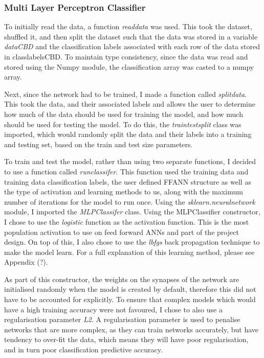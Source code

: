 \documentclass[11pt]{article}
\begin{document}
\subsubsection{Multi Layer Perceptron Classifier}
To initially read the data, a function \textit{read\textunderscore data} was used. This took the dataset, shuffled it, and then split the dataset such that the data was stored in a variable \textit{data\textunderscore CBD} and the classification labels associated with each row of the data stored in {class\textunderscore labels\textunderscore CBD}. To maintain type consistency, since the data was read and stored using the Numpy module, the classification array was casted to a numpy array. 

Next, since the network had to be trained, I made a function called \textit{split\textunderscore data}. This took the data, and their associated labels and allows the user to determine how much of the data should be used for training the model, and how much should be used for testing the model. To do this, the \textit{train\textunderscore test\textunderscore split} class was imported, which would randomly split the data and their labels into a training and testing set, based on the train and test size parameters. 

To train and test the model, rather than using two separate functions, I decided to use a function called \textit{run\textunderscore classifer}. This function used the training data and training data classification labels, the user defined FFANN structure as well as the type of activation and learning methods to us, along with the maximum number of iterations for the model to run once. Using the \textit{sklearn.neural\textunderscore network} module, I imported the \textit{MLPClassifer} class. Using the MLPClassifier constructor, I chose to use the \textit{logistic} function as the activation function. This is the most population activation to use on feed forward ANNs and part of the project design. On top of this,  I also chose to use the \textit{lbfgs} back propagation technique to make the model learn. For a full explanation of this learning method, please see Appendix (?). 

As part of this constructor, the weights on the synapses of the network are initialised randomly when the model is created by default, therefore this did not have to be accounted for explicitly. 
To ensure that complex models which would have a high training accuracy were not favoured, I chose to also use a regularisation parameter \textit{L2}. A regularisation parameter is used to penalise networks that are more complex, as they can train networks accurately, but have tendency to over-fit the data, which means they will have poor regularisation, and in turn poor classification predictive accuracy. 
\end{document}
